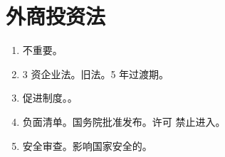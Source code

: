 \section{外商投资法}
\begin{enumerate}
  \item 不重要。
  \item 3 资企业法。旧法。5 年过渡期。
  \item 促进制度。。
  \item 负面清单。国务院批准发布。许可 \hz 禁止进入。
  \item 安全审查。影响国家安全的。
\end{enumerate}
